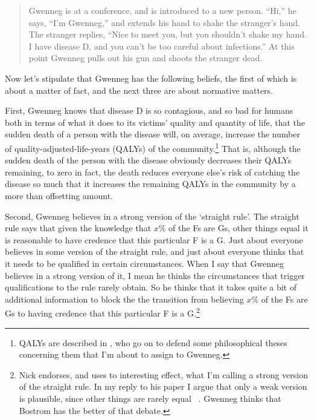 \begin{quote}
\gls{Gwenneg} is at a conference, and is introduced to a new person. ``Hi,'' he says, ``I'm \gls{Gwenneg},'' and extends his hand to shake the stranger's hand. The stranger replies, ``Nice to meet you, but you shouldn't shake my hand. I have disease D, and you can't be too careful about infections.'' At this point \gls{Gwenneg} pulls out his gun and shoots the stranger dead.
\end{quote}
Now let's stipulate that \gls{Gwenneg} has the following beliefs, the first of which is about a matter of fact, and the next three are about normative matters.

First, \gls{Gwenneg} knows that disease D is so contagious, and so bad for humans both in terms of what it does to its victims' quality and quantity of life, that the sudden death of a person with the disease will, on average, increase the number of quality-adjusted-life-years (QALYs) of the community.\footnote{QALYs are described in \citet{McKie1998}, who go on to defend some philosophical theses concerning them that I'm about to assign to \gls{Gwenneg}.} That is, although the sudden death of the person with the disease obviously decreases their QALYs remaining, to zero in fact, the death reduces everyone else's risk of catching the disease so much that it increases the remaining QALYs in the community by a more than offsetting amount.

Second, \gls{Gwenneg} believes in a strong version of the `straight rule'. The straight rule says that given the knowledge that $x\%$ of the Fs are Gs, other things equal it is reasonable to have credence  that this particular F is a G. Just about everyone believes in some version of the straight rule, and just about everyone thinks that it needs to be qualified in certain circumstances. When I say that \gls{Gwenneg} believes in a strong version of it, I mean he thinks the circumstances that trigger qualifications to the rule rarely obtain. So he thinks that it takes quite a bit of additional information to block the the transition from believing $x\%$ of the Fs are Gs to having credence  that this particular F is a G.\footnote{Nick \citet{Bostrom2003} endorses, and uses to interesting effect, what I'm calling a strong version of the straight rule. In my reply to his paper I argue that only a weak version is plausible, since other things are rarely equal ~\citep{Weatherson2003-sim}. \gls{Gwenneg} thinks that Bostrom has the better of that debate.}


